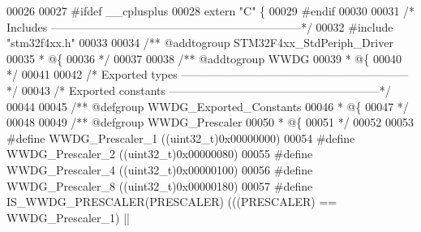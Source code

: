 \begin{DoxyCode}
00026 
00027 \textcolor{preprocessor}{#}\textcolor{preprocessor}{ifdef} \_\_cplusplus
00028  \textcolor{keyword}{extern} \textcolor{stringliteral}{"C"} \{
00029 \textcolor{preprocessor}{#}\textcolor{preprocessor}{endif}
00030 
00031 \textcolor{comment}{/* Includes ------------------------------------------------------------------*/}
00032 \textcolor{preprocessor}{#}\textcolor{preprocessor}{include} "stm32f4xx.h"
00033 
00034 \textcolor{comment}{/** @addtogroup STM32F4xx\_StdPeriph\_Driver}
00035 \textcolor{comment}{  * @\{}
00036 \textcolor{comment}{  */}
00037 
00038 \textcolor{comment}{/** @addtogroup WWDG}
00039 \textcolor{comment}{  * @\{}
00040 \textcolor{comment}{  */}
00041 
00042 \textcolor{comment}{/* Exported types ------------------------------------------------------------*/}
00043 \textcolor{comment}{/* Exported constants --------------------------------------------------------*/}
00044 
00045 \textcolor{comment}{/** @defgroup WWDG\_Exported\_Constants}
00046 \textcolor{comment}{  * @\{}
00047 \textcolor{comment}{  */}
00048 
00049 \textcolor{comment}{/** @defgroup WWDG\_Prescaler }
00050 \textcolor{comment}{  * @\{}
00051 \textcolor{comment}{  */}
00052 
00053 \textcolor{preprocessor}{#}\textcolor{preprocessor}{define} \textcolor{preprocessor}{WWDG\_Prescaler\_1}    \textcolor{preprocessor}{(}\textcolor{preprocessor}{(}\textcolor{preprocessor}{uint32\_t}\textcolor{preprocessor}{)}0x00000000\textcolor{preprocessor}{)}
00054 \textcolor{preprocessor}{#}\textcolor{preprocessor}{define} \textcolor{preprocessor}{WWDG\_Prescaler\_2}    \textcolor{preprocessor}{(}\textcolor{preprocessor}{(}\textcolor{preprocessor}{uint32\_t}\textcolor{preprocessor}{)}0x00000080\textcolor{preprocessor}{)}
00055 \textcolor{preprocessor}{#}\textcolor{preprocessor}{define} \textcolor{preprocessor}{WWDG\_Prescaler\_4}    \textcolor{preprocessor}{(}\textcolor{preprocessor}{(}\textcolor{preprocessor}{uint32\_t}\textcolor{preprocessor}{)}0x00000100\textcolor{preprocessor}{)}
00056 \textcolor{preprocessor}{#}\textcolor{preprocessor}{define} \textcolor{preprocessor}{WWDG\_Prescaler\_8}    \textcolor{preprocessor}{(}\textcolor{preprocessor}{(}\textcolor{preprocessor}{uint32\_t}\textcolor{preprocessor}{)}0x00000180\textcolor{preprocessor}{)}
00057 \textcolor{preprocessor}{#}\textcolor{preprocessor}{define} \textcolor{preprocessor}{IS\_WWDG\_PRESCALER}\textcolor{preprocessor}{(}\textcolor{preprocessor}{PRESCALER}\textcolor{preprocessor}{)} \textcolor{preprocessor}{(}\textcolor{preprocessor}{(}\textcolor{preprocessor}{(}\textcolor{preprocessor}{PRESCALER}\textcolor{preprocessor}{)} \textcolor{preprocessor}{==} WWDG_Prescaler_1\textcolor{preprocessor}{)} \textcolor{preprocessor}{||}

\end{DoxyCode}
